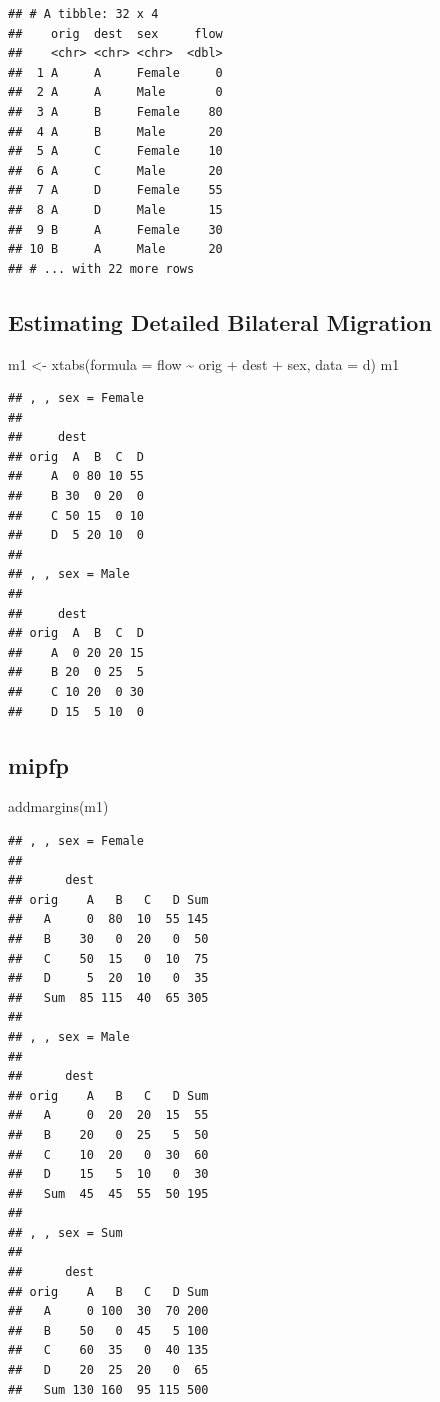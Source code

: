 \documentclass[
]{book}
\newenvironment{Shaded}{\begin{snugshade}}{\end{snugshade}}
\newcommand{\AttributeTok}[1]{\textcolor[rgb]{0.77,0.63,0.00}{#1}}
\newcommand{\FunctionTok}[1]{\textcolor[rgb]{0.00,0.00,0.00}{#1}}
\newcommand{\NormalTok}[1]{#1}
\newcommand{\OtherTok}[1]{\textcolor[rgb]{0.56,0.35,0.01}{#1}}
\newcommand{\SpecialCharTok}[1]{\textcolor[rgb]{0.00,0.00,0.00}{#1}}
\begin{document}
\begin{verbatim}
## # A tibble: 32 x 4
##    orig  dest  sex     flow
##    <chr> <chr> <chr>  <dbl>
##  1 A     A     Female     0
##  2 A     A     Male       0
##  3 A     B     Female    80
##  4 A     B     Male      20
##  5 A     C     Female    10
##  6 A     C     Male      20
##  7 A     D     Female    55
##  8 A     D     Male      15
##  9 B     A     Female    30
## 10 B     A     Male      20
## # ... with 22 more rows
\end{verbatim}

\hypertarget{estimating-detailed-bilateral-migration}{%
\subsection{Estimating Detailed Bilateral Migration}\label{estimating-detailed-bilateral-migration}}

\begin{Shaded}
\begin{Highlighting}[]
\NormalTok{m1 }\OtherTok{\textless{}{-}} \FunctionTok{xtabs}\NormalTok{(}\AttributeTok{formula =}\NormalTok{ flow }\SpecialCharTok{\textasciitilde{}}\NormalTok{ orig }\SpecialCharTok{+}\NormalTok{ dest }\SpecialCharTok{+}\NormalTok{ sex, }\AttributeTok{data =}\NormalTok{ d)}
\NormalTok{m1}
\end{Highlighting}
\end{Shaded}

\begin{verbatim}
## , , sex = Female
## 
##     dest
## orig  A  B  C  D
##    A  0 80 10 55
##    B 30  0 20  0
##    C 50 15  0 10
##    D  5 20 10  0
## 
## , , sex = Male
## 
##     dest
## orig  A  B  C  D
##    A  0 20 20 15
##    B 20  0 25  5
##    C 10 20  0 30
##    D 15  5 10  0
\end{verbatim}

\hypertarget{mipfp-5}{%
\subsection{mipfp}\label{mipfp-5}}

\begin{Shaded}
\begin{Highlighting}[]
\FunctionTok{addmargins}\NormalTok{(m1)}
\end{Highlighting}
\end{Shaded}

\begin{verbatim}
## , , sex = Female
## 
##      dest
## orig    A   B   C   D Sum
##   A     0  80  10  55 145
##   B    30   0  20   0  50
##   C    50  15   0  10  75
##   D     5  20  10   0  35
##   Sum  85 115  40  65 305
## 
## , , sex = Male
## 
##      dest
## orig    A   B   C   D Sum
##   A     0  20  20  15  55
##   B    20   0  25   5  50
##   C    10  20   0  30  60
##   D    15   5  10   0  30
##   Sum  45  45  55  50 195
## 
## , , sex = Sum
## 
##      dest
## orig    A   B   C   D Sum
##   A     0 100  30  70 200
##   B    50   0  45   5 100
##   C    60  35   0  40 135
##   D    20  25  20   0  65
##   Sum 130 160  95 115 500
\end{verbatim}
\end{document}
